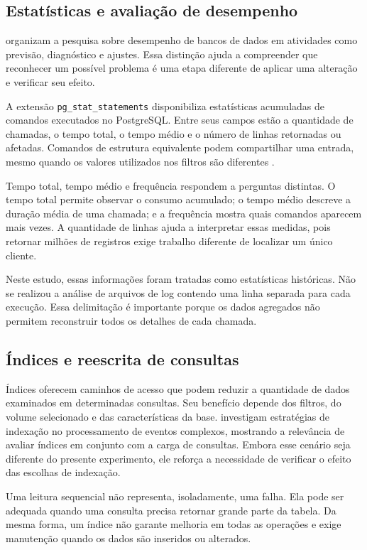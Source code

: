 \documentclass{UNESC}
\newcommand{\codigo}[1]{\texttt{#1}}
\begin{document}
\subsection{Estatísticas e avaliação de desempenho}

 organizam a pesquisa sobre desempenho de bancos de dados em atividades como previsão, diagnóstico e ajustes. Essa distinção ajuda a compreender que reconhecer um possível problema é uma etapa diferente de aplicar uma alteração e verificar seu efeito.

A extensão \codigo{pg\_stat\_statements} disponibiliza estatísticas acumuladas de comandos executados no PostgreSQL. Entre seus campos estão a quantidade de chamadas, o tempo total, o tempo médio e o número de linhas retornadas ou afetadas. Comandos de estrutura equivalente podem compartilhar uma entrada, mesmo quando os valores utilizados nos filtros são diferentes \cite{postgresql2026pgstat}.

Tempo total, tempo médio e frequência respondem a perguntas distintas. O tempo total permite observar o consumo acumulado; o tempo médio descreve a duração média de uma chamada; e a frequência mostra quais comandos aparecem mais vezes. A quantidade de linhas ajuda a interpretar essas medidas, pois retornar milhões de registros exige trabalho diferente de localizar um único cliente.

Neste estudo, essas informações foram tratadas como estatísticas históricas. Não se realizou a análise de arquivos de log contendo uma linha separada para cada execução. Essa delimitação é importante porque os dados agregados não permitem reconstruir todos os detalhes de cada chamada.

\subsection{Índices e reescrita de consultas}

Índices oferecem caminhos de acesso que podem reduzir a quantidade de dados examinados em determinadas consultas. Seu benefício depende dos filtros, do volume selecionado e das características da base.  investigam estratégias de indexação no processamento de eventos complexos, mostrando a relevância de avaliar índices em conjunto com a carga de consultas. Embora esse cenário seja diferente do presente experimento, ele reforça a necessidade de verificar o efeito das escolhas de indexação.

Uma leitura sequencial não representa, isoladamente, uma falha. Ela pode ser adequada quando uma consulta precisa retornar grande parte da tabela. Da mesma forma, um índice não garante melhoria em todas as operações e exige manutenção quando os dados são inseridos ou alterados.
\end{document}
